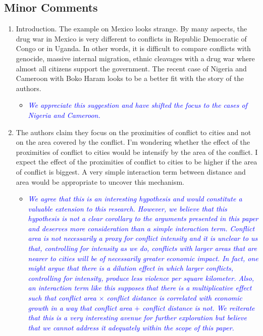 \subsection{Minor Comments}

\begin{enumerate}

\item Introduction. The example on Mexico looks strange. By many aspects, the drug war in Mexico is very different to conflicts in Republic Democratic of Congo or in Uganda. In other words, it is difficult to compare conflicts with genocide, massive internal migration, ethnic cleavages with a drug war where almost all citizens support the government. The recent case of Nigeria and Cameroon with Boko Haram looks to be a better fit with the story of the authors.

\begin{itemize}
\item \textcolor{blue}{\emph{
	We appreciate this suggestion and have shifted the focus to the cases of Nigeria and Cameroon. 
}}
\end{itemize}

\item The authors claim they focus on the proximities of conflict to cities and not on the area covered by the conflict. I’m wondering whether the effect of the proximities of conflict to cities would be intensify by the area of the conflict. I expect the effect of the proximities of conflict to cities to be higher if the area of conflict is biggest. A very simple interaction term between distance and area would be appropriate to uncover this mechanism.

\begin{itemize}
\item \textcolor{blue}{\emph{
	We agree that this is an interesting hypothesis and would constitute a valuable extension to this research. However, we believe that this hypothesis is not a clear corollary to the arguments presented in this paper and deserves more consideration than a simple interaction term. Conflict area is not necessarily a proxy for conflict intensity and it is unclear to us that, controlling for intensity as we do, conflicts with larger areas that are nearer to cities will be of necessarily greater economic impact. In fact, one might argue that there is a dilution effect in which larger conflicts, controlling for intensity, produce less violence per square kilometer. Also, an interaction term like this supposes that there is a multiplicative effect such that \textnormal{conflict area} $\times$ \textnormal{conflict distance} is correlated with economic growth in a way that \textnormal{conflict area} $+$ \textnormal{conflict distance} is not. We reiterate that this is a very interesting avenue for further exploration but believe that we cannot address it adequately within the scope of this paper.
}}
\end{itemize}


\end{enumerate}
